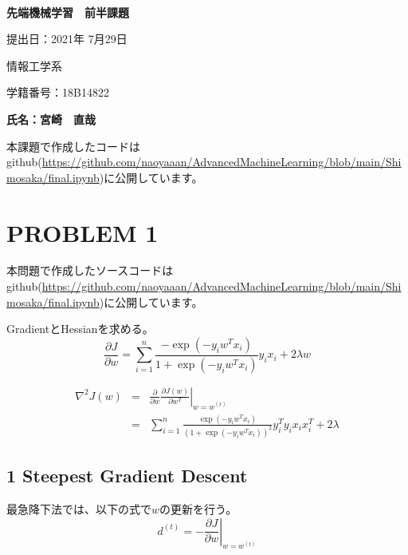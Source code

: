 \documentclass[a4j,11pt]{jarticle}
\begin{document}
\begin{center}
　\vspace{10mm}

{\bf {\huge 先端機械学習　前半課題}}

\vspace{80mm}

提出日：2021年 7月29日

\vspace{10mm}

情報工学系

\vspace{10mm}

学籍番号：18B14822

\vspace{10mm}


\vspace{20mm}

{\bf {\LARGE 氏名：宮崎　直哉}}
\end{center}





\newpage



本課題で作成したコードはgithub(\url{https://github.com/naoyaaan/AdvancedMachineLearning/blob/main/Shimosaka/final.ipynb})に公開しています。

\section{PROBLEM 1}
本問題で作成したソースコードはgithub(\url{https://github.com/naoyaaan/AdvancedMachineLearning/blob/main/Shimosaka/final.ipynb})に公開しています。

GradientとHessianを求める。
\begin{equation}
    \frac{\partial{J}}{\partial{w}} = \sum_{i=1}^{n} \frac{-\exp(-y_iw^{T}x_i)}{1 + \exp(-y_iw^{T}x_i)}y_{i}x_{i} + 2\lambda w
\end{equation}

\begin{eqnarray}
    \nabla^2 J(w) &=& \frac{\partial}{\partial w} \left.\frac{\partial J(w)}{\partial w^{T}}\right|_{w=w^{(t)}} \\
    &=& \sum_{i=1}^{n} \frac{\exp(-y_iw^{T}x_i)}{(1 + \exp(-y_iw^{T}x_i))^2}y^{T}_{i}y_{i}x_{i}x^{T}_{i} + 2\lambda
\end{eqnarray}

\subsection*{1 Steepest Gradient Descent}
最急降下法では、以下の式で$w$の更新を行う。
\begin{equation}
    d^{(t)} = -\left.\frac{\partial{J}}{\partial{w}}\right|_{w=w^{(t)}}
\end{equation}
\end{document}
